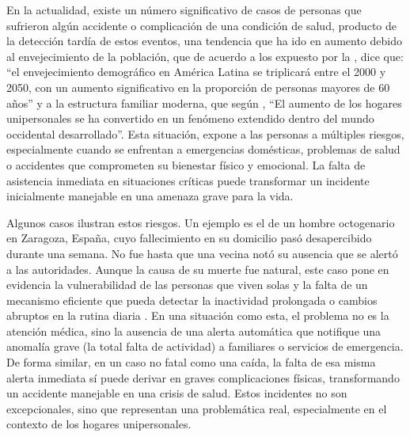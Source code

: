 
En la actualidad, existe un número significativo de casos de personas que sufrieron algún accidente o complicación de una condición de salud, producto de la detección tardía de estos eventos, una tendencia que ha ido en aumento debido al envejecimiento de la población, que de acuerdo a los expuesto por la \citeauthor{cepal_2005} \citeyear{cepal_2005}, dice que: “el envejecimiento demográfico en América Latina se triplicará entre el 2000 y 2050, con un aumento significativo en la proporción de personas mayores de 60 años” y a la estructura familiar moderna, que según \citeauthor{pena2016reciente} \citeyear{pena2016reciente}, ``El aumento de los hogares unipersonales se ha convertido en un fenómeno extendido dentro del mundo occidental desarrollado''. Esta situación, expone a las personas a múltiples riesgos, especialmente cuando se enfrentan a emergencias domésticas, problemas de salud o accidentes que comprometen su bienestar físico y emocional. La falta de asistencia inmediata en situaciones críticas puede transformar un incidente inicialmente manejable en una amenaza grave para la vida.

Algunos casos ilustran estos riesgos. Un ejemplo es el de un hombre octogenario en Zaragoza, España, cuyo fallecimiento en su domicilio pasó desapercibido durante una semana. No fue hasta que una vecina notó su ausencia que se alertó a las autoridades. Aunque la causa de su muerte fue natural, este caso pone en evidencia la vulnerabilidad de las personas que viven solas y la falta de un mecanismo eficiente que pueda detectar la inactividad prolongada o cambios abruptos en la rutina diaria \cite{ralla_hallan_2024}. En una situación como esta, el problema no es la atención médica, sino la ausencia de una alerta automática que notifique una anomalía grave (la total falta de actividad) a familiares o servicios de emergencia. De forma similar, en un caso no fatal como una caída, la falta de esa misma alerta inmediata sí puede derivar en graves complicaciones físicas, transformando un accidente manejable en una crisis de salud. Estos incidentes no son excepcionales, sino que representan una problemática real, especialmente en el contexto de los hogares unipersonales.

